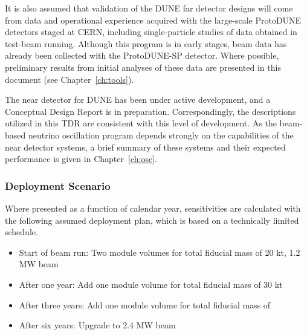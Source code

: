 It is also assumed that validation of the DUNE far detector 
designs will come from data and operational experience acquired 
with the large-scale ProtoDUNE detectors staged at CERN, 
including single-particle studies of data obtained 
in test-beam running.  Although this program is in early stages, 
beam data has already been collected with the ProtoDUNE-SP detector.  
Where possible, preliminary results from initial analyses of these 
data are presented in this document (see Chapter~\ref{ch:tools}).

The near detector for DUNE has been under active development,
and a Conceptual Design Report is in preparation.
Correspondingly, the descriptions utilized in this TDR
are consistent with this level of development.  As the
beam-based neutrino oscillation program depends strongly
on the capabilities of the near detector systems, a brief
summary of these systems and their expected performance is
given in Chapter~\ref{ch:osc}.

\subsubsection{Deployment Scenario}
\label{sec:exec-assm-meth-deployment}

Where presented as a function of calendar year,
sensitivities are calculated with the following
assumed deployment plan, which is based on a
technically limited schedule.
\begin{itemize}
    \item Start of beam run: Two  module %
    volumes for total fiducial mass of 20 kt, 1.2 MW beam
    \item After one year: Add one  module  volume for total fiducial mass of 30 kt
    \item After three years: Add one  module  volume for total fiducial mass of \fdfiducialmass
    \item After six years: Upgrade to 2.4 MW beam
\end{itemize}



